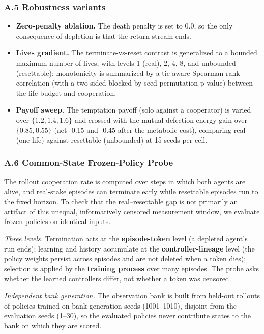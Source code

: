 \documentclass[Afour,sageh,times,doublespace]{sagej}
\providecommand{\tightlist}{\setlength{\itemsep}{0pt}\setlength{\parskip}{0pt}}
\begin{document}
\subsubsection{A.5 Robustness variants}\label{a.5-robustness-variants}

\begin{itemize}
\tightlist
\item
  \textbf{Zero-penalty ablation.} The death penalty is set to 0.0, so the only consequence of depletion is that the return stream ends.
\item
  \textbf{Lives gradient.} The terminate-vs-reset contrast is generalized to a bounded maximum number of lives, with levels 1 (real), 2, 4, 8, and unbounded (resettable); monotonicity is summarized by a tie-aware Spearman rank correlation (with a two-sided blocked-by-seed permutation p-value) between the life budget and cooperation.
\item
  \textbf{Payoff sweep.} The temptation payoff (solo against a cooperator) is varied over \(\{1.2, 1.4, 1.6\}\) and crossed with the mutual-defection energy gain over \(\{0.85, 0.55\}\) (net -0.15 and -0.45 after the metabolic cost), comparing real (one life) against resettable (unbounded) at 15 seeds per cell.
\end{itemize}

\subsubsection{A.6 Common-State Frozen-Policy Probe}\label{a.6-common-state-frozen-policy-probe}

The rollout cooperation rate is computed over steps in which both agents are alive, and real-stake episodes can terminate early while resettable episodes run to the fixed horizon. To check that the real--resettable gap is not primarily an artifact of this unequal, informatively censored measurement window, we evaluate frozen policies on identical inputs.

\emph{Three levels.} Termination acts at the \textbf{episode-token} level (a depleted agent's run ends); learning and history accumulate at the \textbf{controller-lineage} level (the policy weights persist across episodes and are not deleted when a token dies); selection is applied by the \textbf{training process} over many episodes. The probe asks whether the learned controllers differ, not whether a token was censored.

\emph{Independent bank generation.} The observation bank is built from held-out rollouts of policies trained on bank-generation seeds (1001--1010), disjoint from the evaluation seeds (1--30), so the evaluated policies never contribute states to the bank on which they are scored.
\end{document}
